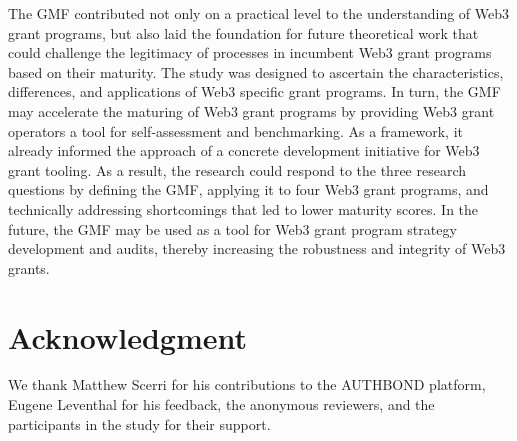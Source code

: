 \documentclass[conference]{IEEEtran}
\begin{document}
The GMF contributed not only on a practical level to the understanding of Web3 grant programs, but also laid the foundation for future theoretical work that could challenge the legitimacy of processes in incumbent Web3 grant programs based on their maturity. The study was designed to ascertain the characteristics, differences, and applications of Web3 specific grant programs. In turn, the GMF may accelerate the maturing of Web3 grant programs by providing Web3 grant operators a tool for self-assessment and benchmarking. As a framework, it already informed the approach of a concrete development initiative for Web3 grant tooling. As a result, the research could respond to the three research questions by defining the GMF, applying it to four Web3 grant programs, and technically addressing shortcomings that led to lower maturity scores. In the future, the GMF may be used as a tool for Web3 grant program strategy development and audits, thereby increasing the robustness and integrity of Web3 grants.

\section*{Acknowledgment}

We thank Matthew Scerri for his contributions to the AUTHBOND platform, Eugene Leventhal for his feedback, the anonymous reviewers, and the participants in the study for their support.



\end{document}
